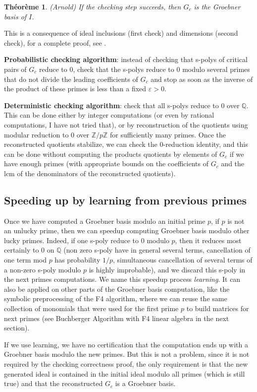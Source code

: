 \documentclass[a4paper,11pt]{article}
\newtheorem{thm}{Théorème}
\newcommand{\Z}{{\mathbb{Z}}}
\newcommand{\Q}{{\mathbb{Q}}}
\begin{document}
\begin{thm} (Arnold)
If the checking step succeeds, then $G_c$ is the Groebner basis of $I$.
\end{thm}

This is a consequence of ideal inclusions (first check) and dimensions (second
check), for a complete proof, see \cite{Arnold2003403}.

{\bf Probabilistic checking algorithm}: instead of checking that s-polys
of critical
pairs of $G_c$ reduce to 0, check that the s-polys reduce to 0 
modulo several primes that do not divide the leading coefficients of
$G_c$ and stop
as soon as the inverse of the product of these primes is less than a
fixed $\varepsilon>0$.

{\bf Deterministic checking algorithm}: check that all s-polys
reduce to 0 over $\Q$. This can be done either by integer computations
(or even by rational computations, I have not tried that),
or by reconstruction of the quotients using modular reduction to 0
over $\Z/p\Z$ for sufficiently many primes. Once the reconstructed
quotients stabilize, we can check the 0-reduction identity, and this
can be done without computing the products quotients by elements of $G_c$
if we have enough primes (with appropriate bounds on
the coefficients of $G_c$ and the lcm of the denominators of the
reconstructed quotients).

\subsection{Speeding up by learning from previous primes} \label{sec:learning}
Once we have computed a Groebner basis modulo an initial prime $p$, if $p$ is
not an unlucky prime, then we can speedup computing Groebner basis
modulo other lucky primes. Indeed, if one s-poly reduce to 0 modulo
$p$, then it reduces most certainly to 0 on $\Q$ (non zero s-poly have
in general several terms, cancellation of one term mod $p$ has
probability $1/p$, simultaneous cancellation of several terms of a non-zero
s-poly modulo $p$ is highly improbable), and we discard this s-poly in the
next primes computations. We name this speedup process {\em learning}. 
It can also
be applied on other parts of the Groebner basis computation, like the
symbolic preprocessing of the F4 algorithm, where we can reuse the
same collection of monomials that were used for the first prime $p$ 
to build matrices for next primes (see Buchberger Algorithm with F4 
linear algebra in the next section).

If we use learning, we have no certification that the computation ends up
with a Groebner basis modulo the new primes. But this is not a problem,
since it is not required by the checking correctness proof, the only
requirement is that the new generated ideal is contained in the
initial ideal modulo all primes (which is still true) and 
that the reconstructed $G_c$ is a Groebner basis.
\end{document}
